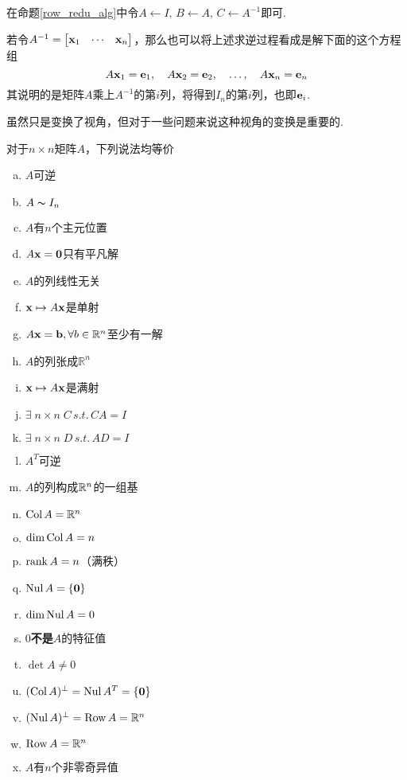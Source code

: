 \begin{analysis}
在命题\ref{row_redu_alg}中令$A\gets I,\,B\gets A,\,C\gets A^{-1}$即可.
\end{analysis}
若令$A^{-1}=\begin{bmatrix}{\mathbf{x}_1}&\cdots&{\mathbf{x}_n}\end{bmatrix}$，那么也可以将上述求逆过程看成是解下面的这个方程组
\[A\mathbf{x}_1=\mathbf{e}_1,\quad A\mathbf{x}_2=\mathbf{e}_2,\quad\dots,\quad A\mathbf{x}_n=\mathbf{e}_n\]
其说明的是矩阵$A$乘上$A^{-1}$的第$i$列，将得到$I_n$的第$i$列，也即$\mathbf{e}_i$.
\par 虽然只是变换了视角，但对于一些问题来说这种视角的变换是重要的.
\newpage
\begin{theorem}[可逆阵定理]
对于$n\times n$矩阵$A$，下列说法均等价
\begin{multicols}{2} %
\begin{enumerate}[(a)]
	\itemsep -3pt
	\item $A$可逆
	\item $A\thicksim I_n$
	\item $A$有$n$个主元位置
	\item $A\mathbf{x}=\mathbf{0}$只有平凡解
	\item $A$的列线性无关
	\item $\mathbf{x}\mapsto A\mathbf{x}$是单射
	\item $A\mathbf{x}=\mathbf{b},\forall b\in\mathbb{R}^n$至少有一解
	\item $A$的列张成$\mathbb{R}^n$
	\item $\mathbf{x}\mapsto A\mathbf{x}$是满射
	\item $\exists\;n\times n\;C\,s.t.\,CA=I$
	\item $\exists\;n\times n\;D\,s.t.\,AD=I$
	\item $A^T$可逆
	\item $A$的列构成$\mathbb{R}^n$的一组基
	\item $\mathrm{Col}\, A=\mathbb{R}^n$
	\item $\mathrm{dim}\,\mathrm{Col}\, A=n$
	\item $\mathrm{rank}\, A=n$（满秩）
	\item $\mathrm{Nul}\, A=\{\mathbf{0}\}$
	\item $\mathrm{dim}\,\mathrm{Nul}\, A=0$
	\item $0$\textbf{不是}$A$的特征值
	\item $\det A\ne 0$
	\item $(\mathrm{Col}\, A)^\perp=\mathrm{Nul}\, A^T=\{\mathbf{0}\}$
	\item $(\mathrm{Nul}\, A)^\perp=\mathrm{Row}\, A=\mathbb{R}^n$
	\item $\mathrm{Row}\, A=\mathbb{R}^n$
	\item $A$有$n$个非零奇异值
\end{enumerate}
\end{multicols}
\end{theorem}
